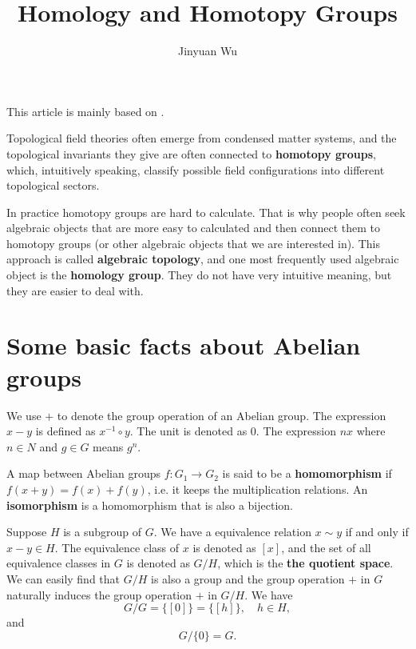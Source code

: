 \documentclass[hyperref, a4paper]{article}
\title{Homology and Homotopy Groups}
\author{Jinyuan Wu}
\newcommand*{\concept}[1]{{\textbf{#1}}}
\def\mathbb#1{#1}%
\begin{document}
\maketitle

This article is mainly based on \cite{nakahara}.

Topological field theories often emerge from condensed matter systems, and the topological invariants they give
are often connected to \concept{homotopy groups}, which, intuitively speaking, classify possible field 
configurations into different topological sectors. 

In practice homotopy groups are hard to calculate. That is why people often seek algebraic objects that 
are more easy to calculated and then connect them to homotopy groups (or other algebraic objects that we
are interested in). This approach is called \concept{algebraic topology}, and one most frequently used 
algebraic object is the \concept{homology group}. They do not have very intuitive meaning, but they are 
easier to deal with.

\section{Some basic facts about Abelian groups}

We use $+$ to denote the group operation of an Abelian group.
The expression $x - y$ is defined as $x^{-1} \circ y$.
The unit is denoted as $0$.
The expression $n x$ where $n \in \mathbb{N}$ and $g \in G$ means $g^n$.

A map between Abelian groups $f: G_1 \to G_2$ is said
to be a \concept{homomorphism} if $f(x + y) = f(x) + f(y)$, i.e. it keeps the multiplication relations. 
An \concept{isomorphism} is a homomorphism that is also a bijection. 

Suppose $H$ is a subgroup of $G$. We have a equivalence relation $x \sim y$ if and only if $x - y \in H$.
The equivalence class of $x$ is denoted as $[x]$, and the set of all equivalence classes in $G$ is denoted 
as $G / H$, which is the \concept{the quotient space}. We can easily find that $G / H$ is also a group 
and the group operation $+$ in $G$ naturally induces the group operation $+$ in $G/H$.
We have 
\begin{equation}
    G / G = \{ [0] \} = \{ [h] \}, \quad h \in H, 
\end{equation}
and 
\begin{equation}
    G / \{0\} = G.
\end{equation}
\end{document}

